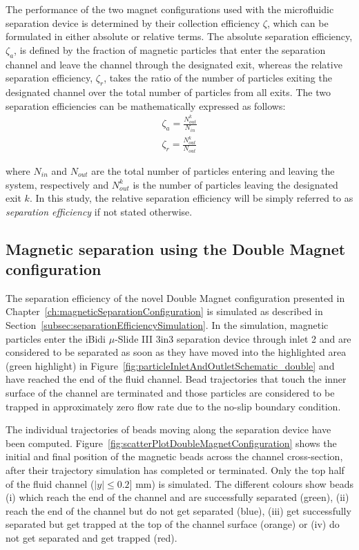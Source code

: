 The performance of the two magnet configurations used with the microfluidic separation device is determined by their collection efficiency $\zeta$, which can be formulated in either absolute or relative terms. The absolute separation efficiency, $\zeta_{a}$, is defined by the fraction of magnetic particles that enter the separation channel and leave the channel through the designated exit, whereas the relative separation efficiency, $\zeta_{r}$, takes the ratio of the number of particles exiting the designated channel over the total number of particles from all exits. The two separation efficiencies can be mathematically expressed as follows:
\begin{eqnarray}
    \zeta_{a} = \frac{N_{out}^{k}}{N_{in}} \\
    \zeta_{r} = \frac{N_{out}^{k}}{N_{out}}
    \label{eqn:separationEfficiency}
\end{eqnarray}

where $N_{in}$ and $N_{out}$ are the total number of particles entering and leaving the system, respectively and $N_{out}^{k}$ is the number of particles leaving the designated exit $k$. In this study, the relative separation efficiency will be simply referred to as \textit{separation efficiency} if not stated otherwise.

\subsection{Magnetic separation using the Double Magnet configuration}
The separation efficiency of the novel Double Magnet configuration presented in Chapter~\ref{ch:magneticSeparationConfiguration} is simulated as described in Section~\ref{subsec:separationEfficiencySimulation}. In the simulation, magnetic particles enter the iBidi $\mu$-Slide III 3in3 separation device through inlet 2 and are considered to be separated as soon as they have moved into the highlighted area (green highlight) in Figure~\ref{fig:particleInletAndOutletSchematic_double} and have reached the end of the fluid channel. Bead trajectories that touch the inner surface of the channel are terminated and those particles are considered to be trapped in approximately zero flow rate due to the no-slip boundary condition. 

The individual trajectories of beads moving along the separation device have been computed. Figure~\ref{fig:scatterPlotDoubleMagnetConfiguration} shows the initial and final position of the magnetic beads across the channel cross-section, after their trajectory simulation has completed or terminated. Only the top half of the fluid channel ($|y| \leq 0.2]$ mm) is simulated. The different colours show beads (i) which reach the end of the channel and are successfully separated (green), (ii) reach the end of the channel but do not get separated (blue), (iii) get successfully separated but get trapped at the top of the channel surface (orange) or (iv) do not get separated and get trapped (red).

